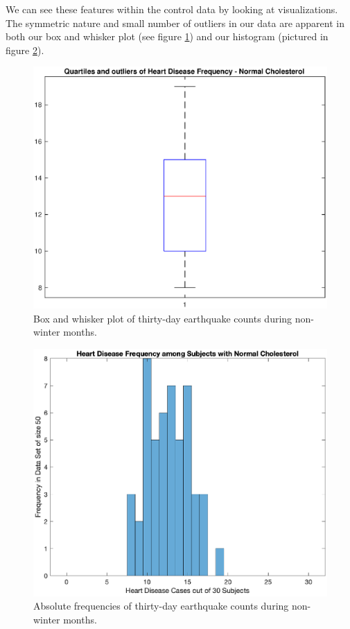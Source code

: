 \documentclass{amsart}
\begin{document}
We can see these features within the control data by looking at visualizations. The symmetric nature and small number of outliers in our data are apparent in both our box and whisker plot (see figure \ref{F:boxplotfinal}) and our histogram (pictured in figure \ref{F:absoluteFrequencies}).
\begin{figure}
\centering
\includegraphics[scale=0.55]{boxplotfinal}
\caption{Box and whisker plot of thirty-day earthquake counts during non-winter months.\label{F:boxplotfinal}}
\end{figure}

\begin{figure}
\centering
\includegraphics[scale=0.55]{histogramfinal}
\caption{Absolute frequencies of thirty-day earthquake counts during non-winter months.\label{F:absoluteFrequencies}}
\end{figure}
\end{document}
